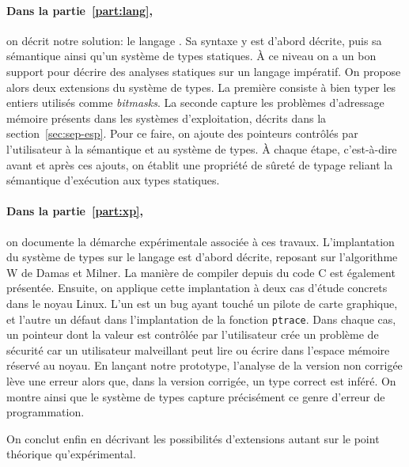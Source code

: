 \paragraph{Dans la partie~\ref{part:lang},} on décrit notre solution: le langage
\langname{}. Sa syntaxe y est d'abord décrite, puis sa sémantique ainsi qu'un
système de types statiques. À ce niveau on a un bon support pour décrire des
analyses statiques sur un langage impératif. On propose alors deux extensions du
système de types. La première consiste à bien typer les entiers utilisés comme
\emph{bitmasks}. La seconde capture les problèmes d'adressage mémoire présents
dans les systèmes d'exploitation, décrits dans la section~\ref{sec:sep-esp}.
Pour ce faire, on ajoute des pointeurs contrôlés par l'utilisateur à la
sémantique et au système de types. À chaque étape, c'est-à-dire avant et après
ces ajouts, on établit une propriété de sûreté de typage reliant la sémantique
d'exécution aux types statiques.

\paragraph{Dans la partie~\ref{part:xp},} on documente la démarche expérimentale
associée à ces travaux. L'implantation du système de types sur le langage
\newspeak est d'abord décrite, reposant sur l'algorithme W de Damas et Milner.
La manière de compiler depuis du code C est également présentée. Ensuite, on
applique cette implantation à deux cas d'étude concrets dans le noyau Linux.
L'un est un bug ayant touché un pilote de carte graphique, et l'autre un défaut
dans l'implantation de la fonction \texttt{ptrace}. Dans chaque cas, un pointeur
dont la valeur est contrôlée par l'utilisateur crée un problème de sécurité car
un utilisateur malveillant peut lire ou écrire dans l'espace mémoire réservé au
noyau. En lançant notre prototype, l'analyse de la version non corrigée lève une
erreur alors que, dans la version corrigée, un type correct est inféré. On
montre ainsi que le système de types capture précisément ce genre d'erreur de
programmation.

On conclut enfin en décrivant les possibilités d'extensions autant sur le point
théorique qu'expérimental.

